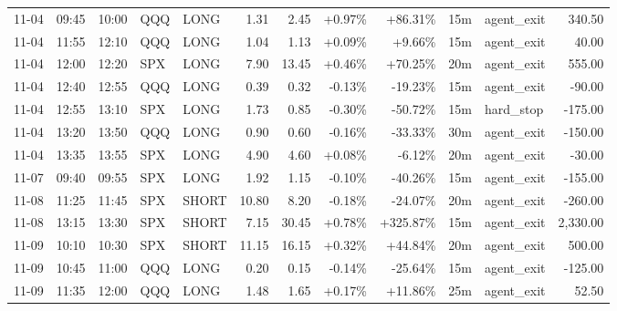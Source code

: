 \documentclass[11pt,a4paper]{article}
\begin{document}
\begin{center}
\begin{longtable}{>{\color{txtmain}}l l l l l r r r r r >{\color{txtmain}}l r}
11-04 & 09:45 & 10:00 & QQQ & LONG & 1.31 & 2.45 & \textcolor{wingreen}{+0.97\%} & \textcolor{wingreen}{+86.31\%} & 15m & agent\_exit & \textcolor{wingreen}{340.50} \\
11-04 & 11:55 & 12:10 & QQQ & LONG & 1.04 & 1.13 & \textcolor{wingreen}{+0.09\%} & \textcolor{wingreen}{+9.66\%} & 15m & agent\_exit & \textcolor{wingreen}{40.00} \\
11-04 & 12:00 & 12:20 & SPX & LONG & 7.90 & 13.45 & \textcolor{wingreen}{+0.46\%} & \textcolor{wingreen}{+70.25\%} & 20m & agent\_exit & \textcolor{wingreen}{555.00} \\
11-04 & 12:40 & 12:55 & QQQ & LONG & 0.39 & 0.32 & \textcolor{lossred}{-0.13\%} & \textcolor{lossred}{-19.23\%} & 15m & agent\_exit & \textcolor{lossred}{-90.00} \\
11-04 & 12:55 & 13:10 & SPX & LONG & 1.73 & 0.85 & \textcolor{lossred}{-0.30\%} & \textcolor{lossred}{-50.72\%} & 15m & hard\_stop & \textcolor{lossred}{-175.00} \\
11-04 & 13:20 & 13:50 & QQQ & LONG & 0.90 & 0.60 & \textcolor{lossred}{-0.16\%} & \textcolor{lossred}{-33.33\%} & 30m & agent\_exit & \textcolor{lossred}{-150.00} \\
11-04 & 13:35 & 13:55 & SPX & LONG & 4.90 & 4.60 & \textcolor{wingreen}{+0.08\%} & \textcolor{lossred}{-6.12\%} & 20m & agent\_exit & \textcolor{lossred}{-30.00} \\
11-07 & 09:40 & 09:55 & SPX & LONG & 1.92 & 1.15 & \textcolor{lossred}{-0.10\%} & \textcolor{lossred}{-40.26\%} & 15m & agent\_exit & \textcolor{lossred}{-155.00} \\
11-08 & 11:25 & 11:45 & SPX & SHORT & 10.80 & 8.20 & \textcolor{lossred}{-0.18\%} & \textcolor{lossred}{-24.07\%} & 20m & agent\_exit & \textcolor{lossred}{-260.00} \\
11-08 & 13:15 & 13:30 & SPX & SHORT & 7.15 & 30.45 & \textcolor{wingreen}{+0.78\%} & \textcolor{wingreen}{+325.87\%} & 15m & agent\_exit & \textcolor{wingreen}{2,330.00} \\
11-09 & 10:10 & 10:30 & SPX & SHORT & 11.15 & 16.15 & \textcolor{wingreen}{+0.32\%} & \textcolor{wingreen}{+44.84\%} & 20m & agent\_exit & \textcolor{wingreen}{500.00} \\
11-09 & 10:45 & 11:00 & QQQ & LONG & 0.20 & 0.15 & \textcolor{lossred}{-0.14\%} & \textcolor{lossred}{-25.64\%} & 15m & agent\_exit & \textcolor{lossred}{-125.00} \\
11-09 & 11:35 & 12:00 & QQQ & LONG & 1.48 & 1.65 & \textcolor{wingreen}{+0.17\%} & \textcolor{wingreen}{+11.86\%} & 25m & agent\_exit & \textcolor{wingreen}{52.50} \\

\end{longtable}
\end{center}
\end{document}
